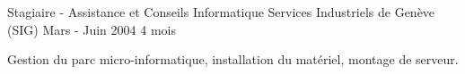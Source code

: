 \begin{cventries}
  \cventry
    {Stagiaire - Assistance et Conseils Informatique}
    {Services Industriels de Genève (SIG)}
    {Mars - Juin 2004}
    {4 mois}
    {
      \begin{cvitems}
        \item{Gestion du parc micro-informatique, installation du matériel,
          montage de serveur.
        }
      \end{cvitems}
    }

\end{cventries}
